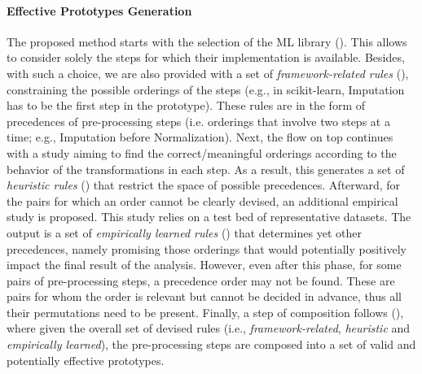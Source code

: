 \paragraph{Effective Prototypes Generation} The proposed method starts with the selection of the ML library ().
This allows to consider solely the steps for which their implementation is available.
Besides, with such a choice, we are also provided with a set of \textit{framework-related rules} (), constraining the possible orderings of the steps (e.g., in scikit-learn, Imputation has to be the first step in the prototype).
These rules are in the form of precedences of pre-processing steps (i.e. orderings that involve two steps at a time;  e.g., Imputation before Normalization).
Next, the flow on top continues with a study
aiming to find the correct/meaningful orderings according to
the behavior of the transformations in each step.
As a result, this generates a set of \textit{heuristic rules} () that restrict the space of possible precedences.
Afterward, for the pairs for which an order cannot be clearly devised, an additional empirical study is proposed.
This study relies on a test bed of representative datasets.
The output is a set of \textit{empirically learned rules} () that determines yet other precedences, namely promising those orderings that would potentially positively impact the final result of the analysis.
However, even after this phase, for some pairs of pre-processing steps, a precedence order may not be found.
These are pairs for whom the order is relevant but cannot be decided in advance, thus all their permutations need to be present.
Finally, a step of composition follows  (), where given the overall set of devised rules (i.e., \textit{framework-related}, \textit{heuristic} and \textit{empirically learned}), the pre-processing steps are composed into a set of valid and potentially effective prototypes.

